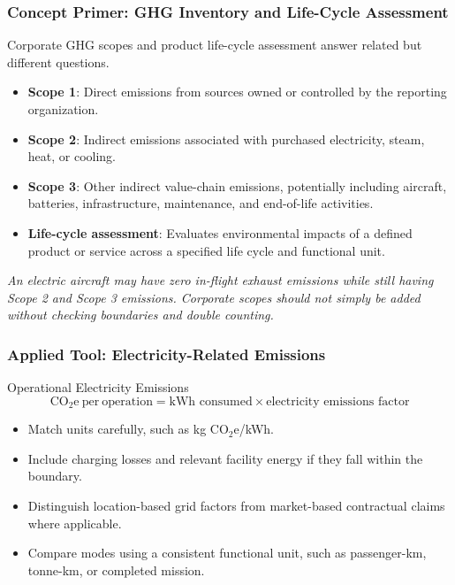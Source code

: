 \documentclass{beamer}
\begin{document}
\begin{frame}[t]
\frametitle{Concept Primer: GHG Inventory and Life-Cycle Assessment}
Corporate GHG scopes and product life-cycle assessment answer related but different questions.
\begin{itemize}
\item \textbf{Scope 1}: Direct emissions from sources owned or controlled by the reporting organization.
\item \textbf{Scope 2}: Indirect emissions associated with purchased electricity, steam, heat, or cooling.
\item \textbf{Scope 3}: Other indirect value-chain emissions, potentially including aircraft, batteries, infrastructure, maintenance, and end-of-life activities.
\item \textbf{Life-cycle assessment}: Evaluates environmental impacts of a defined product or service across a specified life cycle and functional unit.
\end{itemize}
\textit{An electric aircraft may have zero in-flight exhaust emissions while still having Scope 2 and Scope 3 emissions. Corporate scopes should not simply be added without checking boundaries and double counting.}
\end{frame}

\begin{frame}[t]
\frametitle{Applied Tool: Electricity-Related Emissions}
\begin{block}{Operational Electricity Emissions}
\[
\mathrm{CO_2e\ per\ operation}
=\text{kWh consumed}\times\text{electricity emissions factor}
\]
\end{block}
\begin{itemize}
\item Match units carefully, such as kg $\mathrm{CO_2e}$/kWh.
\item Include charging losses and relevant facility energy if they fall within the boundary.
\item Distinguish location-based grid factors from market-based contractual claims where applicable.
\item Compare modes using a consistent functional unit, such as passenger-km, tonne-km, or completed mission.
\end{itemize}
\end{frame}
\end{document}

